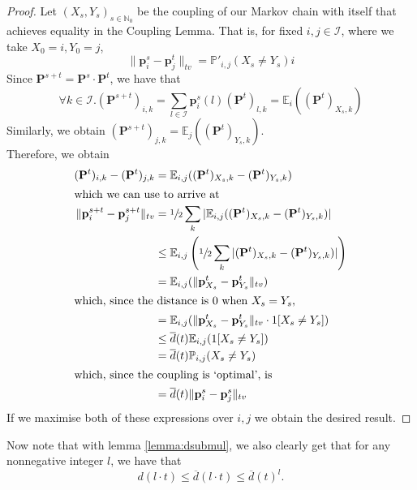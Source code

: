 		\begin{proof}
			Let $(X_s, Y_s)_{s\in\mathbb{N}_0}$ be the coupling of our Markov chain
			with itself that achieves equality in the Coupling Lemma. That is,
			for fixed $i,j \in \mathcal{I}$, where we take $X_0 = i, Y_0 = j$,
			$$
				\|\mathbf{p}^s_i - \mathbf{p}_j^t \|_{tv} = \mathbb{P'}_{i,j}
				(X_s \neq Y_s)i
			$$
			Since $\mathbf{P}^{s+t} = \mathbf{P}^s \cdot \mathbf{P}^t$, we have
			that 
			$$	
				\forall{k \in \mathcal{I}}. (\mathbf{P}^{s+t})_{i,k}
				=\sum_{l \in \mathcal{I}} \mathbf{p}^s_i(l) (\mathbf{P}^t)_{l,k}
				=\mathbb{E}_i((\mathbf{P}^t)_{X_s, k})
			$$
			Similarly, we obtain $(\mathbf{P}^{s+t})_{j,k} = \mathbb{E}_j(
			(\mathbf{P}^t)_{Y_s, k})$.\\
			Therefore, we obtain
			\begin{align*}
				(\mathbf{P}^t)_{i,k} - (\mathbf{P}^t)_{j,k} &=
			\mathbb{E}_{i,j}((\mathbf{P}^t)_{X_s, k}-(\mathbf{P}^t)_{Y_s, k})\\
			\intertext{which we can use to arrive at}
			\|\mathbf{p}_i^{s+t} - \mathbf{p}_j^{s+t}\|_{tv} &= 
			\sfrac{1}{2} \sum_{k} |\mathbb{E}_{i,j}((\mathbf{P}^t)_{X_s, k}-
			(\mathbf{P}^t)_{Y_s, k})|\\
			&\leq \mathbb{E}_{i,j}\left(\sfrac{1}{2}\sum_{k}|(\mathbf{P}^t)_{X_s, 
			k}- (\mathbf{P}^t)_{Y_s, k})|\right) \\
			&= \mathbb{E}_{i,j}(\|\mathbf{p}^t_{X_s}-\mathbf{p}^t_{Y_s}\|_{tv})\\
			\intertext{which, since the distance is $0$ when $X_s=Y_s$,}
			&= \mathbb{E}_{i,j}(\|\mathbf{p}^t_{X_s}-\mathbf{p}^t_{Y_s}\|_{tv}
			\cdot 1[X_s \neq Y_s]) \\
			&\leq \overline d(t) \mathbb{E}_{i,j}(1[X_s \neq Y_s]) \\
			&= \overline d(t) \mathbb{P}_{i,j}(X_s \neq Y_s) \\
			\intertext{which, since the coupling is `optimal', is}
			&= \overline d(t) \|\mathbf{p}_i^s - \mathbf{p}_j^s\|_{tv}
			\end{align*}
			If we maximise both of these expressions over $i,j$ we obtain the 
			desired result.
		\end{proof}

		Now note that with lemma \ref{lemma:dsubmul}, we also clearly get that for any
		nonnegative integer $l$, we have that 
		$$
			d(l\cdot t) \leq \overline d(l\cdot t) \leq \overline{d}(t)^l.
		$$
		
